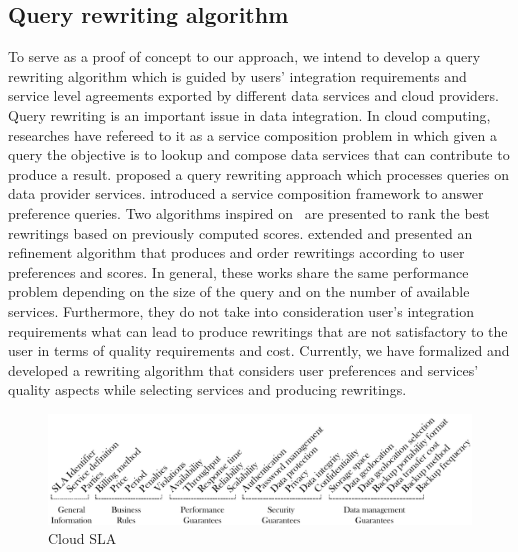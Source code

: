 \subsection{Query rewriting algorithm}
To serve as a proof of concept to our approach, we intend to develop a query rewriting algorithm which is guided by users' integration requirements and service level agreements exported by different data services and cloud providers. Query rewriting is an important issue in data integration. In cloud computing, researches have refereed to it as a service composition problem in which given a query the objective is to lookup and compose data services that can contribute to produce a result. \cite{Barhamgi2010} proposed a query rewriting approach which processes queries on data provider services. \cite{Benouaret2011} introduced a service composition framework to answer preference queries. Two algorithms inspired on~\cite{Barhamgi2010} are presented to rank the best rewritings based on previously computed scores. \cite{ba2014} extended \cite{Umberto} and presented an refinement algorithm that produces and order rewritings according to user preferences and scores. In general, these works share the same performance problem depending on the size of the query and on the number of available services. Furthermore, they do not take into consideration user's integration requirements what can lead to produce rewritings that are not satisfactory to the user in terms of quality requirements and cost. Currently, we have formalized and developed a rewriting algorithm that considers user preferences and services' quality aspects while selecting services and producing rewritings. 

\begin{figure}[h!]
\center
\includegraphics[scale=0.57]{Cloud_SLA.pdf}
\caption{Cloud SLA}\label{fig:cloudsla}
\end{figure}